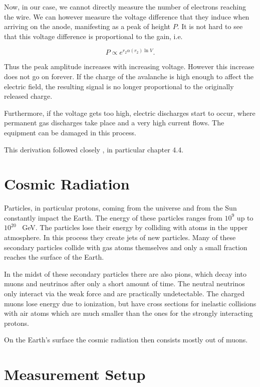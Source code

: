 \documentclass[12pt]{article}
\begin{document}
Now, in our case, we cannot directly measure the number of electrons reaching the wire. We can however measure the voltage difference that they induce when arriving on the anode, manifesting as a peak of height $P$. It is not hard to see that this voltage difference is proportional to the gain, i.e.
	
\begin{equation}
	P \propto e^{r_2\alpha(r_2)\ln{V}}.
\end{equation}

Thus the peak amplitude increases with increasing voltage. However this increase does not go on forever. If the charge of the avalanche is high enough to affect the electric field, the resulting signal is no longer proportional to the originally released charge.

Furthermore, if the voltage gets too high, electric discharges start to occur, where permanent gas discharges take place and a very high current flows. The equipment can be damaged in this process. 

This derivation followed closely \cite{DriftChamberBook}, in particular chapter 4.4.

\section{Cosmic Radiation}

Particles, in particular protons, coming from the universe and from the Sun constantly impact the Earth. The energy of these particles ranges from $10^9$ up to $10^{20}$ \SI{}{\giga\electronvolt}. The particles lose their energy by colliding with atoms in the upper atmosphere. In this process they create jets of new particles. Many of these secondary particles collide with gas atoms themselves and only a small fraction reaches the surface of the Earth.

 In the midst of these secondary particles there are also pions, which decay into muons and neutrinos after only a short amount of time. The neutral neutrinos only interact via the weak force and are practically undetectable. The charged muons lose energy due to ionization, but have cross sections for inelastic collisions with air atoms which are much smaller than the ones for the strongly interacting protons.

On the Earth's surface the cosmic radiation then consists mostly out of muons.

\section{Measurement Setup}
\end{document}
